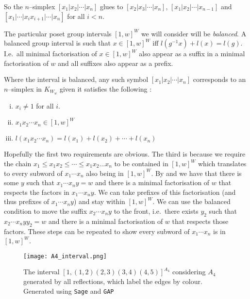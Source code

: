 \documentclass[class=article, crop=false]{standalone}
\begin{document}
So the $n$--simplex $[x_1 | x_2 | \cdots | x_n]$ glues to $[x_2|x_3|\cdots|x_n]$, $[x_1|x_2|\cdots|x_{n-1}]$ and \newline $[x_1| \cdots | x_ix_{i+1} | \cdots |x_n]$ for all $i<n$.

The particular poset group intervals $[1,w]^W$ we will consider will be \emph{balanced}. A balanced group interval is such that  $x \in [1,w]^W$ iff $l(g^{-1}x) + l(x) = l(g)$. I.e.~all minimal factorisation of $x \in [1,w]^W$ also appear as a suffix in a minimal factorisation of $w$ and all suffixes also appear as a prefix.

Where the interval is balanced, any such symbol  $[x_1 | x_2 | \cdots | x_n]$ corresponds to an $n$--simplex in $K_{W_w}$ given it satisfies the following \cite[Definition 2.8]{paolini_salvetti_kpi1_2021}:
\begin{enumerate}[i)]
    \item \label{item:interval_complex_requirement_1} $x_i \neq 1$ for all $i$.
    \item \label{item:interval_complex_requirement_2} $x_1 x_2 \cdots x_n \in [1,w]^W$
    \item \label{item:interval_complex_requirement_3} $l(x_1x_2\cdots x_n) = l(x_1) + l(x_2) + \cdots + l(x_n)$ 
\end{enumerate}

Hopefully the first two requirements are obvious. The third is because we require the chain $x_1 \leq x_1x_2 \leq \cdots \leq x_1x_2\ldots x_{n}$ to be contained in $[1,w]^W$ which translates to every subword of $x_1\cdots x_n$ also being in $[1,w]^W$. By  and  we have that there is some $y$ such that $x_1 \cdots x_n y = w$ and there is a minimal factorisation of $w$ that respects the factors in $ x_1 \cdots x_n y$. We can take prefixes of this factorisation (and thus prefixes of $ x_1 \cdots x_n y$) and stay within $[1,w]^W$. We can use the balanced condition to move the suffix $x_2\cdots x_n y$ to the front, i.e.~there exists $y_2$ such that $x_2\cdots x_n yy_2=w$ and there is a minimal factorisation of $w$ that respects those factors. These steps can be repeated to show every subword of $x_1 \cdots x_n $ is in $[1,w]^W$.

\begin{figure}
	\centering
	\texttt{[image: A4\_interval.png]}
	\caption{The interval $[1, (1,2)(2,3)(3,4)(4,5)]^{A_4}$ considering $A_4$ generated by all reflections, which label the edges by colour. Generated using \texttt{Sage} and \texttt{GAP} \cite{sagemath_2020, gap_2022}}
	\label{fig:A4_interval}
\end{figure}
\end{document}
